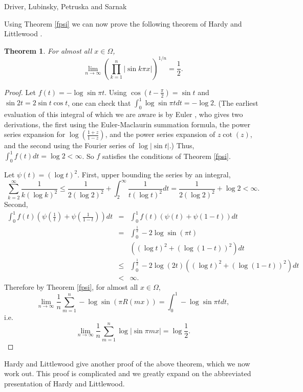 \documentclass{article}
\newtheorem{theorem}{Theorem}
\begin{document}
Driver, Lubinsky, Petruska and Sarnak \cite{sarnak}


Using Theorem \ref{fpsi} we can now prove the following theorem of Hardy and Littlewood \cite[p.~88, Theorem~2]{XXIV}.

\begin{theorem}
For almost all $x \in \Omega$, 
\[
\lim_{n \to \infty} \left( \prod_{k=1}^n |\sin k\pi x| \right)^{1/n}=\frac{1}{2}.
\]
\label{bigtheorem}
\end{theorem}
\begin{proof}
Let $f(t)=-\log \sin \pi t$. Using $\cos(t-\frac{\pi}{2})=\sin t$ and $\sin 2t=2\sin t \cos t$, one can check that  $\int_0^1 \log \sin \pi t dt=-\log 2$. (The earliest evaluation of this integral of which we are aware
is by Euler \cite{E393}, who gives two derivations, the first using the Euler-Maclaurin summation formula, the power
series expansion for $\log\left( \frac{1+z}{1-z} \right)$, and the power series expansion of $z\cot(z)$,
and the second using the Fourier series of
$\log | \sin t|$.) Thus, $\int_0^1 f(t) dt=\log 2<\infty$. So $f$ satisfies the conditions of Theorem \ref{fpsi}.

Let $\psi(t)=(\log t)^2$. First, upper bounding the series by an integral,
\[
\sum_{k=2}^\infty \frac{1}{k(\log k)^2}\leq \frac{1}{2(\log 2)^2}+\int_2^\infty \frac{1}{t(\log t)^2} dt=
\frac{1}{2(\log 2)^2}+\log 2 <\infty.
\]
Second, 
\begin{eqnarray*}
\int_0^1 f(t) \left( \psi\left(\frac{1}{t}\right)+\psi\left(\frac{1}{1-t}\right) \right) dt&=&\int_0^1 f(t) \left(\psi(t)+\psi(1-t) \right) dt\\
&=&\int_0^{\frac{1}{2}} -2\log \sin (\pi t)\\
&& \left((\log t)^2+(\log(1-t))^2\right) dt \\
&\leq&\int_0^{\frac{1}{2}} -2\log (2t)  \left((\log t)^2+(\log(1-t))^2\right) dt \\
&<&\infty.
\end{eqnarray*}
Therefore by Theorem \ref{fpsi},
for almost all $x \in \Omega$,
\[
\lim_{n \to \infty} \frac{1}{n} \sum_{m=1}^n -\log \sin(\pi R(mx))= \int_0^1 -\log \sin \pi t dt,
\]
i.e.
\[
\lim_{n \to \infty} \frac{1}{n} \sum_{m=1}^n \log |\sin \pi m x|= \log \frac{1}{2}.
\]
\end{proof}


Hardy and Littlewood give another proof \cite[p.~86, Theorem~1]{XXIV} of the above theorem, which we now work out.
This proof is complicated and we greatly expand on the abbreviated presentation of Hardy and Littlewood.
\end{document}
